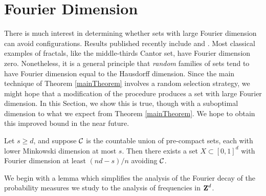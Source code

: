 \section{Fourier Dimension}

There is much interest in determining whether sets with large Fourier dimension can avoid configurations. Results published recently include \cite{PramanikLaba} and \cite{Shmerkin}. Most classical examples of fractals, like the middle-thirds Cantor set, have Fourier dimension zero. Nonetheless, it is a general principle that \emph{random} families of sets tend to have Fourier dimension equal to the Hausdorff dimension. Since the main technique of Theorem \ref{mainTheorem} involves a random selection strategy, we might hope that a modification of the procedure produces a set with large Fourier dimension. In this Section, we show this is true, though with a suboptimal dimension to what we expect from Theorem \ref{mainTheorem}. We hope to obtain this improved bound in the near future.

\begin{theorem} \label{FourierTheorem}
    Let $s \geq d$, and suppose $\operatorname{\mathcal{C}}$ is the countable union of pre-compact sets, each with lower Minkowski dimension at most $s$. Then there exists a set $X \subset [0,1]^d$ with Fourier dimension at least $(nd - s)/n$ avoiding $\operatorname{\mathcal{C}}$.
\end{theorem}

We begin with a lemma which simplifies the analysis of the Fourier decay of the probability measures we study to the analysis of frequencies in $\operatorname{\mathbf{Z}}^d$.

